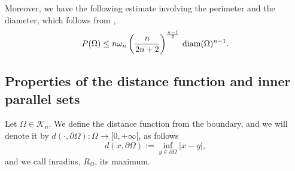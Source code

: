 \documentclass[oneside,a4paper,11pt,notitlepage]{article}
\newcommand{\abs}[1]{{\left|#1\right|}}
\theoremstyle{definition}
\theoremstyle{plain}
\theoremstyle{definition}
\DeclareMathOperator{\diam}{\, \textup{diam}}
\begin{document}
Moreover, we have the following estimate involving the perimeter and the diameter, which follows from \cite[equation (7)]{fenchel_bonnesen},
\begin{equation}\label{eq:perdiam}
\displaystyle{P(\Omega)\le n\omega_n \left(\frac{n}{2n+2}\right)^{\frac{n-1}{2}} \diam(\Omega)^{n-1}}.
 \end{equation}

 

 \subsection{Properties of the distance function and inner parallel sets} \label{innere}
Let $\Omega\in \mathcal{K}_n$. We define the distance function from the boundary, and we will denote it by $ d(\cdot, \partial \Omega):\Omega \to [0,+\infty[$, as follows 
 \begin{equation*}
     d(x,\partial\Omega):=\inf_{y\in\partial\Omega}\abs{x-y},
 \end{equation*}
 and we call inradius, $R_\Omega$, its maximum.
 
\end{document}
